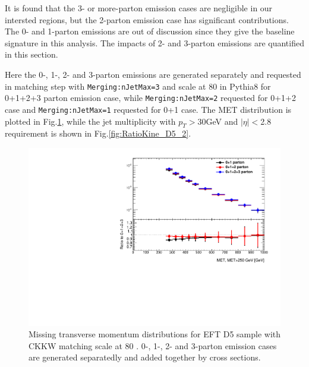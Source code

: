 It is found that the 3- or more-parton emission cases are negligible in our intersted regions, but the 2-parton emission case has significant contributions. The 0- and 1-parton emissions are out of discussion since they give the baseline signature in this analysis. The impacts of 2- and 3-parton emissions are quantified in this section.

Here the 0-, 1-, 2- and 3-parton emissions are generated separately and requested in matching step with \texttt{Merging:nJetMax=3} and scale at 80 \gev in Pythia8 for 0+1+2+3 parton emission case, while \texttt{Merging:nJetMax=2} requested for 0+1+2 case and \texttt{Merging:nJetMax=1} requested for 0+1 case. The MET distribution is plotted in Fig.\ref{fig:RatioKine_D5}, while the jet multiplicity with $p_{T}>$30GeV and $|\eta|<$2.8 requirement is shown in Fig.\ref{fig:RatioKine_D5_2}.

\begin{figure}[h!]
	\centering  
	\includegraphics[width=0.8\linewidth]{figures/monojet_appendix/h_MET_MET250.pdf}
	\caption{Missing transverse momentum distributions for EFT D5 sample with CKKW matching scale at 80 \gev. 0-, 1-, 2- and 3-parton emission cases are generated separatedly and added together by cross sections.}
	\label{fig:RatioKine_D5}
\end{figure}


